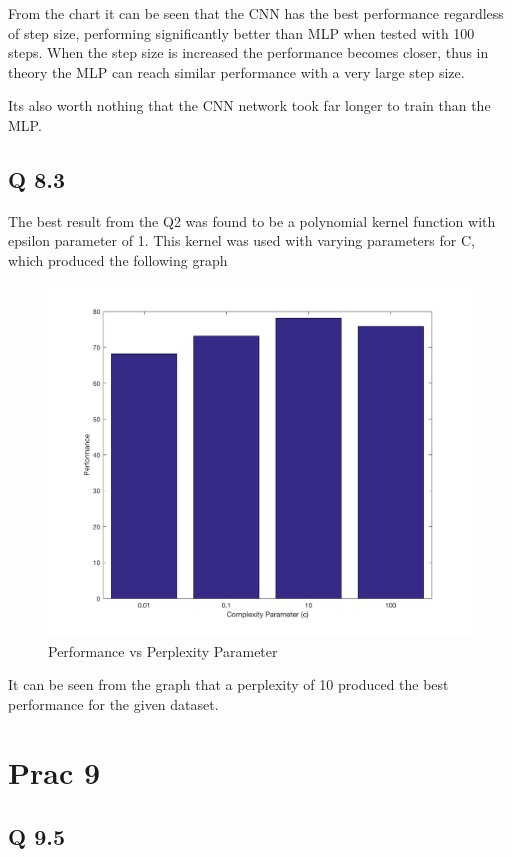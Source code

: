 From the chart it can be seen that the CNN has the best performance regardless of step size,
performing significantly better than MLP when tested with 100 steps.
When the step size is increased the performance becomes closer,
thus in theory the MLP can reach similar performance with a very large step size.

Its also worth nothing that the CNN network took far longer to train than the MLP.

\subsection*{Q 8.3}

The best result from the Q2 was found to be a polynomial kernel function with epsilon parameter of 1.
This kernel was used with varying parameters for C, which produced the following graph

\begin{figure}[H]
	\centering
	\caption{Performance vs Perplexity Parameter}
	\includegraphics[width=0.7\linewidth]{../../pracs/prac8/q3}
\end{figure}

It can be seen from the graph that a perplexity of 10 produced the best performance for the given dataset.

\section*{Prac 9}

\subsection*{Q 9.5}


